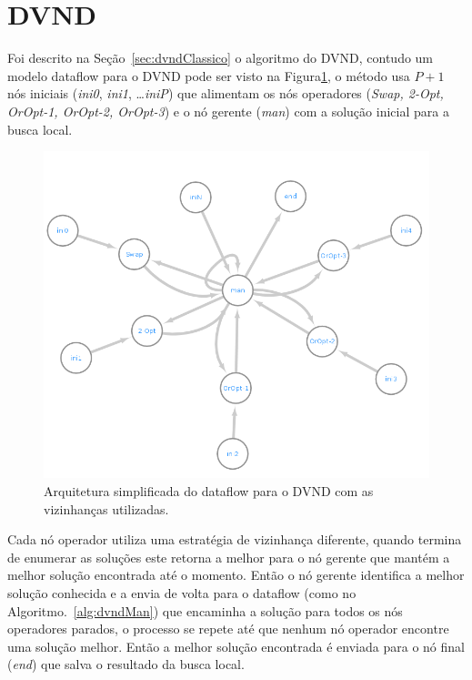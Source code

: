 \section{DVND}\label{subsec:dvnd}

Foi descrito na Seção~\ref{sec:dvndClassico} o algoritmo do DVND, contudo um modelo dataflow para o DVND pode ser visto na Figura\ref{fig:dvndGraph}, o método usa $P + 1$ nós iniciais (\textit{ini0}, \textit{ini1}, \dots \textit{iniP}) que alimentam os nós operadores (\textit{Swap, 2-Opt, OrOpt-1, OrOpt-2, OrOpt-3}) e o nó gerente (\textit{man}) com a solução inicial para a busca local.

\begin{figure}[htbp]
    \centerline{\includegraphics[scale=0.6]{figuras/dvnd/DVND_dataflow_nomes.png}}
    \caption{Arquitetura simplificada do dataflow para o DVND com as vizinhanças utilizadas.}
    \label{fig:dvndGraph}
\end{figure}

Cada nó operador utiliza uma estratégia de vizinhança diferente, quando termina de enumerar as soluções este retorna a melhor para o nó gerente que mantém a melhor solução encontrada até o momento.
Então o nó gerente identifica a melhor solução conhecida e a envia de volta para o dataflow (como no Algoritmo.~\ref{alg:dvndMan}) que encaminha a solução para todos os nós operadores parados, o processo se repete até que nenhum nó operador encontre uma solução melhor.
Então a melhor solução encontrada é enviada para o nó final (\textit{end}) que salva o resultado da busca local.

